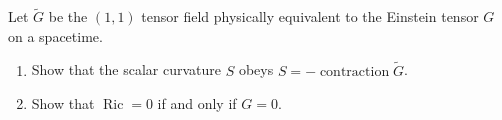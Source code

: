 Let $\tilde{G}$ be the $(1,1)$ tensor field physically equivalent to the Einstein tensor $G$ on a spacetime.
\begin{enumerate}
\item[(a)] Show that the scalar curvature $S$ obeys $S = -\operatorname{contraction} \tilde{G}$.
\item[(b)] Show that $\operatorname{Ric} = 0$ if and only if $G = 0$.
\end{enumerate}
